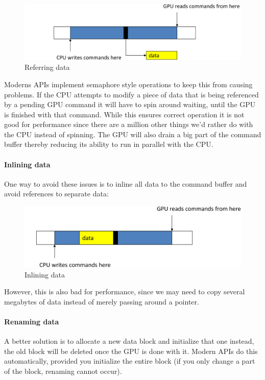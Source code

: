 \begin{figure}[h]
    \centering
    \includegraphics[width=\linewidth]{images/gpu-buffer-referring-data}
    \caption{Referring data}
    \label{fig:gpu-buffer-referring-data}
\end{figure}

Moderns APIs implement semaphore style operations to keep this from causing problems.
If the CPU attempts to modify a piece of data that is being referenced by a pending GPU command it will have to spin
around waiting, until the GPU is finished with that command.
While this ensures correct operation it is not good for
performance since there are a million other things we’d
rather do with the CPU instead of spinning.
The GPU will also drain a big part of the command
buffer thereby reducing its ability to run in parallel with
the CPU\@.

\paragraph{Inlining data}
One way to avoid these issues is to inline all data to the command buffer and avoid references to separate data:

\begin{figure}[h]
    \centering
    \includegraphics[width=\linewidth]{images/gpu-buffer-inlining-data}
    \caption{Inlining data}
    \label{fig:inlining-data}
\end{figure}

However, this is also bad for performance, since we
may need to copy several megabytes of data instead of
merely passing around a pointer.

\paragraph{Renaming data}
A better solution is to allocate a new data block and
initialize that one instead, the old block will be deleted
once the GPU is done with it.
Modern APIs do this automatically, provided you
initialize the entire block (if you only change a part of the
block, renaming cannot occur).

